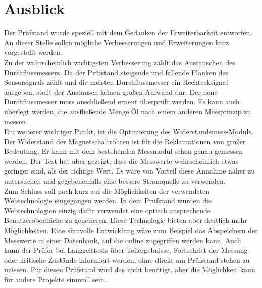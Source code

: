 \newpage
\section{Ausblick}
Der Prüfstand wurde speziell mit dem Gedanken der Erweiterbarkeit entworfen. An dieser Stelle sollen mögliche Verbesserungen und Erweiterungen kurz vorgestellt werden.
\\
Zu der wahrscheinlich wichtigsten Verbesserung zählt das Austauschen des Durchflussmessers. Da der Prüfstand steigende und fallende Flanken des Sensorsignals zählt und die meisten Durchflussmesser ein Rechtecksignal ausgeben, stellt der Austausch keinen großen Aufwand dar. Der neue Durchflussmesser muss anschließend erneut überprüft werden. Es kann auch überlegt werden, die ausfließende Menge Öl nach einem anderen Messprinzip zu messen.
\\
Ein weiterer wichtiger Punkt, ist die Optimierung des Widerstandsmess-Moduls. Der Widerstand der Magnetschaltröhren ist für die Reklamationen von großer Bedeutung. Er kann mit dem bestehenden Messmodul schon genau gemessen werden. Der Test hat aber gezeigt, dass die Messwerte wahrscheinlich etwas geringer sind, als der richtige Wert. Es wäre von Vorteil diese Annahme näher zu untersuchen und gegebenenfalls eine bessere Stromquelle zu verwenden.
\\
Zum Schluss soll noch kurz auf die Möglichkeiten der verwendeten Webtechnologie eingegangen werden. In dem Prüfstand wurden die Webtechnologien einzig dafür verwendet eine optisch ansprechende Benutzeroberfläche zu generieren. Diese Technologie bieten aber deutlich mehr Möglichkeiten. Eine sinnvolle Entwicklung wäre zum Beispiel das Abspeichern der Messwerte in einer Datenbank, auf die online zugegriffen werden kann. Auch kann der Prüfer bei Langzeittests über Teilergebnisse, Fortschritt der Messung oder kritische Zustände informiert werden, ohne direkt am Prüfstand stehen zu müssen. Für diesen Prüfstand wird das nicht benötigt, aber die Möglichkeit kann für andere Projekte sinnvoll sein.
